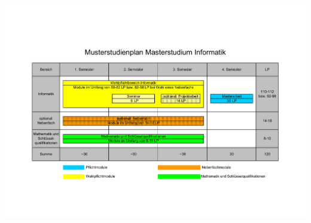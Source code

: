 \begin{minipage}{1.0\linewidth}
	\begin{center}     
 		\includegraphics[width=\textwidth,totalheight=0.5\textheight ]{bilder/studienplan_msc/Musterstudienplan_MSc.pdf}
	\end{center} 
\end{minipage}

